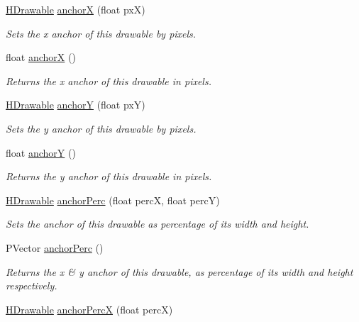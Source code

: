 \begin{DoxyCompactItemize}
\hyperlink{classhype_1_1drawable_1_1_h_drawable}{H\-Drawable} \hyperlink{classhype_1_1drawable_1_1_h_drawable_a8328584252a6d346495091efea24e925}{anchor\-X} (float px\-X)
\begin{DoxyCompactList}\small\item\em Sets the x anchor of this drawable by pixels. \end{DoxyCompactList}\item 
float \hyperlink{classhype_1_1drawable_1_1_h_drawable_a5eaf9532fac11c32781e75c0c5c10912}{anchor\-X} ()
\begin{DoxyCompactList}\small\item\em Returns the x anchor of this drawable in pixels. \end{DoxyCompactList}\item 
\hyperlink{classhype_1_1drawable_1_1_h_drawable}{H\-Drawable} \hyperlink{classhype_1_1drawable_1_1_h_drawable_a5f01745bf4fbd08a6740144cf5845da5}{anchor\-Y} (float px\-Y)
\begin{DoxyCompactList}\small\item\em Sets the y anchor of this drawable by pixels. \end{DoxyCompactList}\item 
float \hyperlink{classhype_1_1drawable_1_1_h_drawable_aed21ff57386ffdc3266ff7721bcfe3e3}{anchor\-Y} ()
\begin{DoxyCompactList}\small\item\em Returns the y anchor of this drawable in pixels. \end{DoxyCompactList}\item 
\hyperlink{classhype_1_1drawable_1_1_h_drawable}{H\-Drawable} \hyperlink{classhype_1_1drawable_1_1_h_drawable_a481f398231c8da57560e463ce6c5b5db}{anchor\-Perc} (float perc\-X, float perc\-Y)
\begin{DoxyCompactList}\small\item\em Sets the anchor of this drawable as percentage of its width and height. \end{DoxyCompactList}\item 
P\-Vector \hyperlink{classhype_1_1drawable_1_1_h_drawable_af1e613803f084a5df438b124878444f9}{anchor\-Perc} ()
\begin{DoxyCompactList}\small\item\em Returns the x \& y anchor of this drawable, as percentage of its width and height respectively. \end{DoxyCompactList}\item 
\hyperlink{classhype_1_1drawable_1_1_h_drawable}{H\-Drawable} \hyperlink{classhype_1_1drawable_1_1_h_drawable_a78ae3773359b55e8a84df8319fd72f20}{anchor\-Perc\-X} (float perc\-X)

\end{DoxyCompactItemize}
